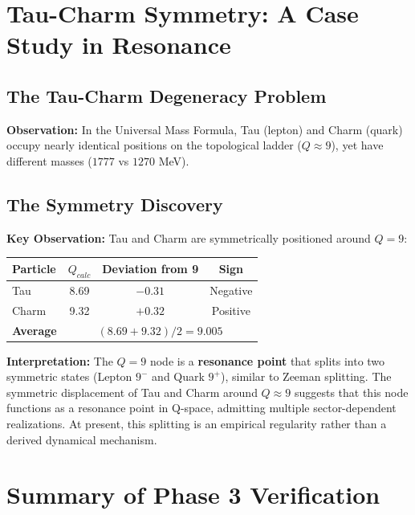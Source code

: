 \documentclass[11pt,a4paper]{book}
\theoremstyle{remark}
\begin{document}
\section{Tau-Charm Symmetry: A Case Study in Resonance}

\subsection{The Tau-Charm Degeneracy Problem}

\textbf{Observation:} In the Universal Mass Formula, Tau (lepton) and Charm (quark) occupy nearly identical positions on the topological ladder ($Q \approx 9$), yet have different masses ($1777$ vs $1270$ MeV).

\subsection{The Symmetry Discovery}

\textbf{Key Observation:} Tau and Charm are symmetrically positioned around $Q = 9$:
\begin{table}[H]
\centering
\begin{tabular}{|l|c|c|c|}
\hline
\textbf{Particle} & \textbf{$Q_{calc}$} & \textbf{Deviation from 9} & \textbf{Sign} \\
\hline
Tau & 8.69 & $-0.31$ & Negative \\
Charm & 9.32 & $+0.32$ & Positive \\
\hline
\textbf{Average} & \multicolumn{3}{c|}{$(8.69 + 9.32)/2 = 9.005$} \\
\hline
\end{tabular}
\end{table}

\textbf{Interpretation:} The $Q = 9$ node is a \textbf{resonance point} that splits into two symmetric states (Lepton $9^-$ and Quark $9^+$), similar to Zeeman splitting. The symmetric displacement of Tau and Charm around $Q \approx 9$ suggests that this node functions as a resonance point in Q-space, admitting multiple sector-dependent realizations. At present, this splitting is an empirical regularity rather than a derived dynamical mechanism.

\section{Summary of Phase 3 Verification}
\end{document}
